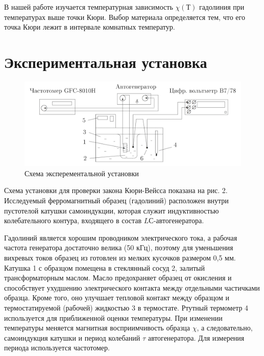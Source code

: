 \documentclass[12pt]{kiarticle} %
\begin{document}
В нашей работе изучается температурная зависимость $ \chi(Т) $ гадолиния
при температурах выше точки Кюри. Выбор материала определяется
тем, что его точка Кюри лежит в интервале комнатных температур.

\section{Экспериментальная установка} 
\begin{figure}[h!]
	\centering
	\includegraphics[width=\linewidth]{pictures/342_stand}
	\caption{Схема эксперементальной установки}
	\label{fig:342stand}
\end{figure}

Схема установки для проверки закона Кюри-Вейсса показана на рис. 2. Исследуемый ферромагнитный образец (гадолиний) расположен внутри пустотелой катушки самоиндукции, которая служит индуктивностью колебательного контура, входящего в состав $ LС $-автогенератора. 

Гадолиний является хорошим проводником электрического тока, а рабочая
частота генератора достаточно велика (50 кГц), поэтому для уменьшения
вихревых токов образец из готовлен из мелких кусочков размером 0,5 мм.
Катушка 1 с образцом помещена в стеклянный сосуд 2, залитый трансформаторным маслом. Масло предохраняет образец от окисления и способствует ухудшению электрического контакта между отдельными частичками образца. Кроме того, оно улучшает тепловой контакт между образцом и термостатируемой (рабочей) жидкостью 3 в термостате. Ртутный термометр 4 используется для приближенной оценки температуры.
При изменении температуры меняется магнитная восприимчивость образца
$ \chi $, а следовательно, самоиндукция катушки и период колебаний $ \tau $ автогенератора. Для измерения периода используется частотомер.
\end{document}
